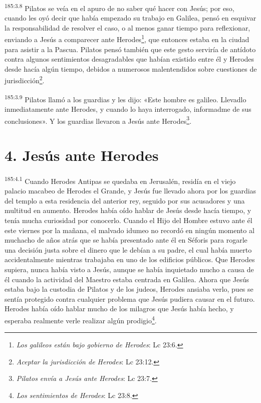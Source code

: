 \par 
\textsuperscript{185:3.8} Pilatos se veía en el apuro de no saber qué hacer con Jesús; por eso, cuando les oyó decir que había empezado su trabajo en Galilea, pensó en esquivar la responsabilidad de resolver el caso, o al menos ganar tiempo para reflexionar, enviando a Jesús a comparecer ante Herodes\footnote{\textit{Los galileos están bajo gobierno de Herodes}: Lc 23:6.}, que entonces estaba en la ciudad para asistir a la Pascua. Pilatos pensó también que este gesto serviría de antídoto contra algunos sentimientos desagradables que habían existido entre él y Herodes desde hacía algún tiempo, debidos a numerosos malentendidos sobre cuestiones de jurisdicción\footnote{\textit{Aceptar la jurisdicción de Herodes}: Lc 23:12.}.

\par 
\textsuperscript{185:3.9} Pilatos llamó a los guardias y les dijo: «Este hombre es galileo. Llevadlo inmediatamente ante Herodes, y cuando lo haya interrogado, informadme de sus conclusiones». Y los guardias llevaron a Jesús ante Herodes\footnote{\textit{Pilatos envía a Jesús ante Herodes}: Lc 23:7.}.

\section*{4. Jesús ante Herodes}
\par 
\textsuperscript{185:4.1} Cuando Herodes Antipas se quedaba en Jerusalén, residía en el viejo palacio macabeo de Herodes el Grande, y Jesús fue llevado ahora por los guardias del templo a esta residencia del anterior rey, seguido por sus acusadores y una multitud en aumento. Herodes había oído hablar de Jesús desde hacía tiempo, y tenía mucha curiosidad por conocerlo. Cuando el Hijo del Hombre estuvo ante él este viernes por la mañana, el malvado idumeo no recordó en ningún momento al muchacho de años atrás que se había presentado ante él en Séforis para rogarle una decisión justa sobre el dinero que le debían a su padre, el cual había muerto accidentalmente mientras trabajaba en uno de los edificios públicos. Que Herodes supiera, nunca había visto a Jesús, aunque se había inquietado mucho a causa de él cuando la actividad del Maestro estaba centrada en Galilea. Ahora que Jesús estaba bajo la custodia de Pilatos y de los judeos, Herodes ansiaba verlo, pues se sentía protegido contra cualquier problema que Jesús pudiera causar en el futuro. Herodes había oído hablar mucho de los milagros que Jesús había hecho, y esperaba realmente verle realizar algún prodigio\footnote{\textit{Los sentimientos de Herodes}: Lc 23:8.}.

